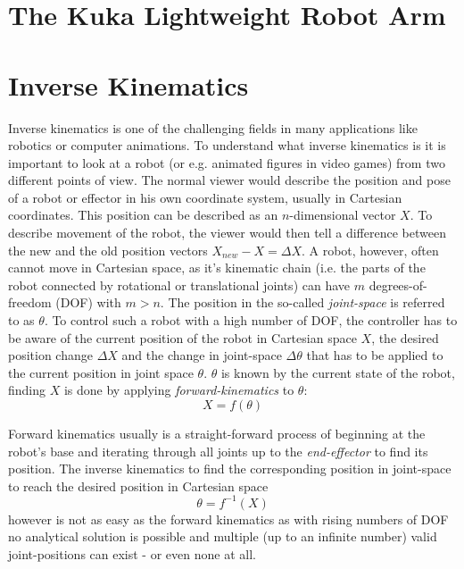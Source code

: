\section{The Kuka Lightweight Robot Arm}

\section{Inverse Kinematics}

Inverse kinematics is one of the challenging fields in many applications like robotics or computer animations\cite{Starke2017}. To understand what inverse kinematics is it is important to look at a robot (or e.g. animated figures in video games) from two different points of view. The normal viewer would describe the position and pose of a robot or effector in his own coordinate system, usually in Cartesian coordinates. This position can be described as an $n$-dimensional vector $X$. To describe movement of the robot, the viewer would then tell a difference between the new and the old position vectors $X_{new}-X=\Delta X$. A robot, however, often cannot move in Cartesian space, as it's kinematic chain (i.e. the parts of the robot connected by rotational or translational joints) can have $m$ degrees-of-freedom (DOF) with $m > n$. The position in the so-called \textit{joint-space} is referred to as $\theta$. To control such a robot with a high number of DOF, the controller has to be aware of the current position of the robot in Cartesian space $X$, the desired position change $\Delta X$ and the change in joint-space $\Delta \theta$ that has to be applied to the current position in joint space $\theta$. $\theta$ is known by the current state of the robot, finding $X$ is done by applying \textit{forward-kinematics} to $\theta$:
\begin{equation*}
	X = f(\theta)
\end{equation*}

Forward kinematics usually is a straight-forward process of beginning at the robot's base and iterating through all joints up to the \textit{end-effector} to find its position. The inverse kinematics to find the corresponding position in joint-space to reach the desired position in Cartesian space
\begin{equation*}
\theta = f^{-1}(X)
\end{equation*}
however is not as easy as the forward kinematics as with rising numbers of DOF no analytical solution is possible and multiple (up to an infinite number) valid joint-positions can exist - or even none at all\cite{DextquotesingleSouza}.

